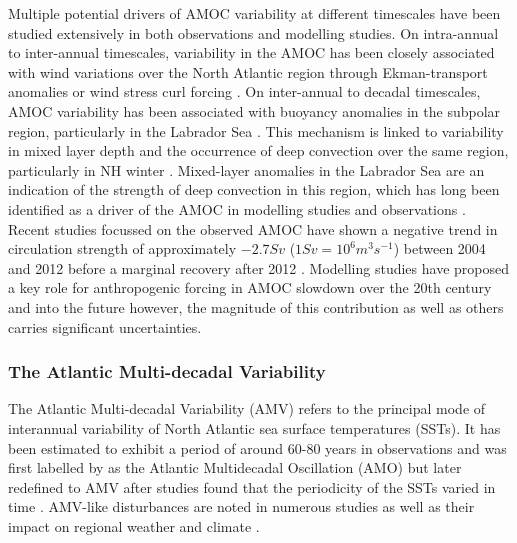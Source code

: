 Multiple potential drivers of AMOC variability at different timescales have been studied extensively in both observations and modelling studies. On intra-annual to inter-annual timescales, variability in the AMOC has been closely associated with wind variations over the North Atlantic region through Ekman-transport anomalies or wind stress curl forcing \citep{wangCharacteristic2019, mccarthyObserved2012, mielkeObserved2013, yangLocal2015}. On inter-annual to decadal timescales, AMOC variability has been associated with buoyancy anomalies in the subpolar region, particularly in the Labrador Sea \citep{delworthInterdecadal1993, medhaugMechanisms2012}. This mechanism is linked to variability in mixed layer depth and the occurrence of deep convection over the same region, particularly in NH winter \citep{boningDecadal2006a, biastochCauses2008a, robsonCauses2012, wangVariability2015}. Mixed-layer anomalies in the Labrador Sea are an indication of the strength of deep convection in this region, which has long been identified as a driver of the AMOC in modelling studies \citep{edenMechanism2001, edenNorth2001} and observations \citep{latifPerspective2011}. Recent studies focussed on the observed AMOC have shown a negative trend in circulation strength of approximately $-2.7 Sv$ ($1 Sv = 10^6 m^3 s^{-1}$) between 2004 and 2012 \citep{smeedNorth2018} before a marginal recovery after 2012 \citep{smeedAtlantic2019}. Modelling studies have proposed a key role for anthropogenic forcing in AMOC slowdown over the 20th century and into the future \cite{liuOverlooked2017, bakkerFate2016, liuMechanisms2019} however, the magnitude of this contribution as well as others carries significant uncertainties.

\subsubsection*{The Atlantic Multi-decadal Variability}
The Atlantic Multi-decadal Variability (AMV) refers to the principal mode of interannual variability of North Atlantic sea surface temperatures (SSTs). It has been estimated to exhibit a period of around 60-80 years in observations and was first labelled by \cite{Kerr2000} as the Atlantic Multidecadal Oscillation (AMO) but later redefined to AMV after studies found that the periodicity of the SSTs varied in time \citep{Gray2004,Knudsen2011}. AMV-like disturbances are noted in numerous studies \citep{Kushnir,Frankcombe2010,Medhaug2011} as well as their impact on regional weather and climate \citep{Ting2011}.

